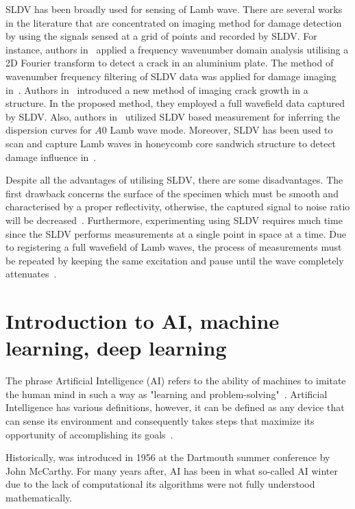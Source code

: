 SLDV has been broadly used for sensing of Lamb wave. 
There are several works in the literature that are concentrated on imaging method for damage detection by using the signals sensed at a grid of points and recorded by SLDV.
For instance, authors in~\cite{Yu2013} applied a frequency wavenumber domain analysis utilising a 2D Fourier transform to detect a crack in an aluminium plate. 
The method of wavenumber frequency filtering of SLDV data was applied for damage imaging in~\cite{Ruzzene2007}. 
Authors in~\cite{Kudela2015} introduced a new method of imaging crack growth in a structure.
In the proposed method, they employed a full wavefield data captured by SLDV.
Also, authors in~\cite{Harb2015} utilized SLDV based measurement for inferring  the dispersion curves for \(A0\) Lamb wave mode. 
Moreover, SLDV has been used to scan and capture Lamb waves in honeycomb core sandwich structure to detect damage influence in~\cite{Lamboul2013}.

Despite all the advantages of utilising SLDV, there are some disadvantages. 
The first drawback concerns the surface of the specimen which must be smooth and characterised by a proper reflectivity, otherwise, the captured signal to noise ratio will be decreased~\cite{Ostachowicz2014}. 
Furthermore, experimenting using  SLDV requires much time since the SLDV performs measurements at a single point in space at a time.
Due to registering a full wavefield of Lamb waves, the process of measurements must be repeated by keeping the same excitation and pause until the wave completely attenuates~\cite{Ostachowicz2014}.


\section[Introduction to AI, ML and deep learning]{Introduction to AI, machine learning,  \DIFadd{\\and} deep learning}

The phrase Artificial Intelligence (AI) refers to the ability of machines to imitate the human mind in such a way as "learning and problem-solving"~\cite{Russell2010}.
Artificial Intelligence has various definitions, however, it can be defined as any device that can sense its environment and consequently takes steps that maximize its opportunity of accomplishing its goals~\cite{Russell2010}.

Historically,   was  introduced in 1956 at the Dartmouth summer conference by John McCarthy.
For many years after, AI has been in what so-called AI winter due to the lack of   computational   its algorithms were not fully understood mathematically.

